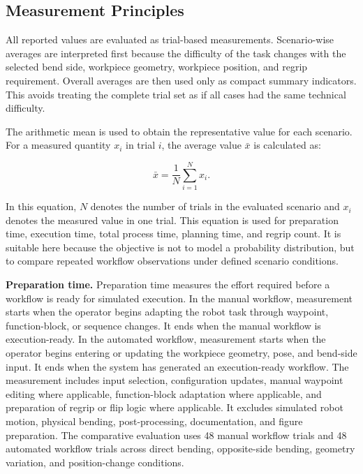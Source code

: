 \subsection{Measurement Principles}
\label{subsec:measurement-principles}

All reported values are evaluated as trial-based measurements. Scenario-wise averages are interpreted first because the difficulty of the task changes with the selected bend side, workpiece geometry, workpiece position, and regrip requirement. Overall averages are then used only as compact summary indicators. This avoids treating the complete trial set as if all cases had the same technical difficulty.

The arithmetic mean is used to obtain the representative value for each scenario. For a measured quantity \(x_i\) in trial \(i\), the average value \(\bar{x}\) is calculated as:

\begin{equation}
\bar{x}=\frac{1}{N}\sum_{i=1}^{N}x_i .
\label{eq:evaluation-average}
\end{equation}

In this equation, \(N\) denotes the number of trials in the evaluated scenario and \(x_i\) denotes the measured value in one trial. This equation is used for preparation time, execution time, total process time, planning time, and regrip count. It is suitable here because the objective is not to model a probability distribution, but to compare repeated workflow observations under defined scenario conditions.

\label{subsec:preparation-time-definition}
\noindent\textbf{Preparation time.}
Preparation time measures the effort required before a workflow is ready for simulated execution. In the manual workflow, measurement starts when the operator begins adapting the robot task through waypoint, function-block, or sequence changes. It ends when the manual workflow is execution-ready. In the automated workflow, measurement starts when the operator begins entering or updating the workpiece geometry, pose, and bend-side input. It ends when the system has generated an execution-ready workflow. The measurement includes input selection, configuration updates, manual waypoint editing where applicable, function-block adaptation where applicable, and preparation of regrip or flip logic where applicable. It excludes simulated robot motion, physical bending, post-processing, documentation, and figure preparation. The comparative evaluation uses 48 manual workflow trials and 48 automated workflow trials across direct bending, opposite-side bending, geometry variation, and position-change conditions.

